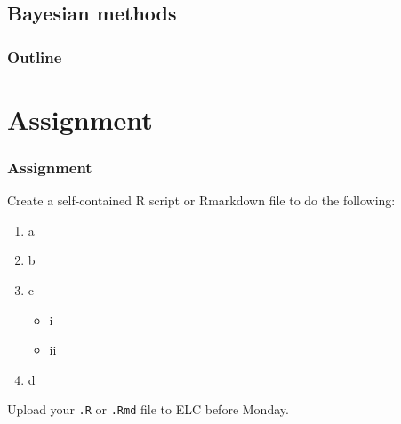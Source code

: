 \documentclass[color=usenames,dvipsnames]{beamer}\usepackage[]{graphicx}\usepackage[]{color}
\begin{document}







\subsection{Bayesian methods}



\begin{frame}[plain]
  \frametitle{Outline}
  \Large
\end{frame}







\section{Assignment}




\begin{frame}[fragile]
  \frametitle{Assignment}
  \footnotesize
  Create a self-contained R script or Rmarkdown file
  to do the following:
  \vfill
  \begin{enumerate}
    \footnotesize
    \item a
    \item b
    \item c 
      \begin{itemize}
        \footnotesize
        \item i
        \item ii
      \end{itemize}
    \item d
  \end{enumerate}
  \vfill
  Upload your {\tt .R} or {\tt .Rmd} file to ELC before Monday. 
\end{frame}
\end{document}
